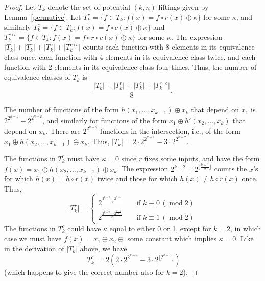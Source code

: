 \documentclass[10pt,a4paper]{amsart}
\begin{document}
    \begin{proof}
    Let $T_k$ denote the set of potential $(k, n)$-liftings given by Lemma~\ref{permutive}. Let $T^r_k = \{ f \in T_k : f(x) = f \circ r(x) \oplus \kappa\}$ for some $\kappa$, and similarly $T^c_k = \{ f \in T_k : f(x) = f \circ c(x) \oplus \kappa\}$ and $T^{r \circ c}_k = \{ f \in T_k : f(x) = f \circ r \circ c(x) \oplus \kappa\}$ for some $\kappa$. The expression $\lvert T_k\rvert + \lvert T^r_k\rvert + \lvert T^c_k\rvert + \lvert T^{r \circ c}_k\rvert$ counts each function with 8 elements in its equivalence class once, each function with 4 elements in its equivalence class twice, and each function with 2 elements in its equivalence class four times. Thus, the number of equivalence classes of $T_k$ is $$\frac{\lvert T_k\rvert + \lvert T^r_k\rvert + \lvert T^c_k\rvert + \lvert T^{r \circ c}_k\rvert}{8}.$$
    
    The number of functions of the form $h(x_1, \dotsc, x_{k-1}) \oplus x_k$ that depend on $x_1$ is $2^{2^{k-1}} - 2^{2^{k-2}}$, and similarly for functions of the form $x_1 \oplus h'(x_2, \dotsc, x_k)$ that depend on $x_k$. There are $2^{2^{k-2}}$ functions in the intersection, i.e., of the form $x_1 \oplus h(x_2, \dotsc,  x_{k-1}) \oplus x_k$. Thus, $\lvert T_k\rvert = 2 \cdot 2^{2^{k-1}} - 3 \cdot 2^{2^{k-2}}$.
    
    The functions in $T^r_k$ must have $\kappa=0$ since $r$ fixes some inputs, and have the form $f(x) = x_1 \oplus h(x_2, \dotsc, x_{k-1}) \oplus x_k$. The expression $2^{k-2} + 2^{\lfloor \frac{k-1}{2}\rfloor}$ counts the $x$'s for which $h(x) = h \circ r(x)$ twice and those for which $h(x) \neq h \circ r(x)$ once. Thus,
    \[
    \lvert T^r_k\rvert=
    \begin{cases}
        2^{\frac{2^{k-2} + 2^{\frac{k}{2}-1}}{2}} &\quad\text{if }k \equiv 0\, (\operatorname{mod} 2)\\
        2^{\frac{2^{k-2} + 2^{\frac{k-1}{2}}}{2}} &\quad\text{if }k \equiv 1\, (\operatorname{mod} 2)
    \end{cases}
    \]
    The functions in $T^c_k$ could have $\kappa$ equal to either 0 or 1, except for $k=2$, in which case we must have $f(x) = x_1 \oplus x_2 \oplus $ some constant which implies $\kappa=0$. Like in the derivation of $\lvert T_k\rvert$ above, we have $$\lvert T^c_k\rvert = 2 \left( 2 \cdot 2^{2^{k-2}} - 3 \cdot 2^{\lfloor 2^{k-3} \rfloor} \right)$$ (which happens to give the correct number also for $k=2$).
    

\end{proof}
\end{document}
